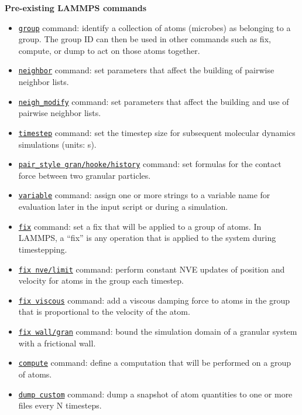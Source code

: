 \documentclass[11pt,a4paper,openright]{article}
\begin{document}
\noindent\textbf{Pre-existing LAMMPS commands}\\
\begin{itemize} [nosep]
    \item \href{http://lammps.sandia.gov/doc/group.html}{\tt group} command: identify a collection of atoms (microbes) as belonging to a group. The group ID can then be used in other commands such as fix, compute, or dump to act on those atoms together.
    \item \href{http://lammps.sandia.gov/doc/neighbor.html}{\tt neighbor} command: set parameters that affect the building of pairwise neighbor lists.
    \item \href{http://lammps.sandia.gov/doc/neigh_modify.html}{\tt neigh\_modify} command: set parameters that affect the building and use of pairwise neighbor lists.
    \item \href{http://lammps.sandia.gov/doc/timestep.html}{\tt timestep} command: set the timestep size for subsequent molecular dynamics simulations (units: s).
    \item  \href{http://lammps.sandia.gov/doc/pair_gran.html}{\tt pair\_style gran/hooke/history} command: set formulas for the contact force between two granular particles.
    \item \href{http://lammps.sandia.gov/doc/variable.html}{\tt variable} command: assign one or more strings to a variable name for evaluation later in the input script or during a simulation.
    \item \href{http://lammps.sandia.gov/doc/fix.html}{\tt fix} command: set a fix that will be applied to a group of atoms. In LAMMPS, a ``fix'' is any operation that is applied to the system during timestepping.
    \item \href{http://lammps.sandia.gov/doc/fix_nve_limit.html}{\tt fix nve/limit} command: perform constant NVE updates of position and velocity for atoms in the group each timestep.
    \item \href{http://lammps.sandia.gov/doc/fix_viscous.html}{\tt fix viscous} command: add a viscous damping force to atoms in the group that is proportional to the velocity of the atom.
    \item \href{http://lammps.sandia.gov/doc/fix_wall_gran.html}{\tt fix wall/gran} command: bound the simulation domain of a granular system with a frictional wall.
    \item \href{http://lammps.sandia.gov/doc/compute.html}{\tt compute} command: define a computation that will be performed on a group of atoms. 
    \item \href{http://lammps.sandia.gov/doc/dump.html}{\tt dump custom} command: dump a snapshot of atom quantities to one or more files every N timesteps.

\end{itemize}
\end{document}
